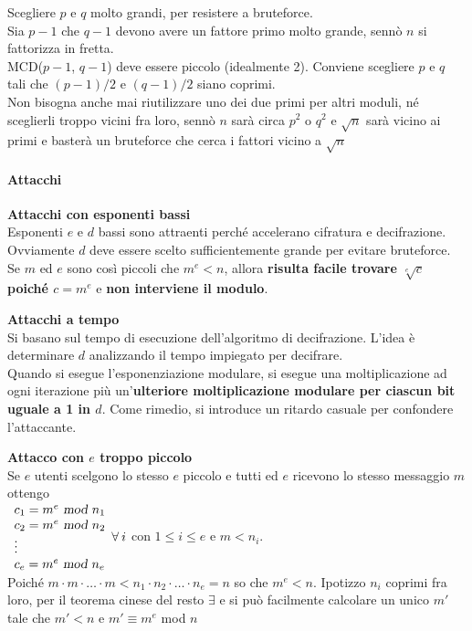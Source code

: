 \documentclass[10pt]{book}
\begin{document}
Scegliere $p$ e $q$ molto grandi, per resistere a bruteforce.\\
Sia $p-1$ che $q-1$ devono avere un fattore primo molto grande, sennò $n$ si fattorizza in fretta.\\
MCD($p-1$, $q-1$) deve essere piccolo (idealmente 2). Conviene scegliere $p$ e $q$ tali che $(p-1)/2$ e $(q-1)/2$ siano coprimi.\\
Non bisogna anche mai riutilizzare uno dei due primi per altri moduli, né sceglierli troppo vicini fra loro, sennò $n$ sarà circa $p^2$ o $q^2$ e $\sqrt{n}$ sarà vicino ai primi e basterà un bruteforce che cerca i fattori vicino a $\sqrt{n}$
\paragraph{Attacchi}
\begin{list}{}{}
	\item \textbf{Attacchi con esponenti bassi}\\
	Esponenti $e$ e $d$ bassi sono attraenti perché accelerano cifratura e decifrazione. Ovviamente $d$ deve essere scelto sufficientemente grande per evitare bruteforce.\\
	Se $m$ ed $e$ sono così piccoli che $m^e < n$, allora \textbf{risulta facile trovare $\sqrt[e]{c}$ poiché $c = m^e$} e \textbf{non interviene il modulo}.
	\item \textbf{Attacchi a tempo}\\
	Si basano sul tempo di esecuzione dell'algoritmo di decifrazione. L'idea è determinare $d$ analizzando il tempo impiegato per decifrare.\\
	Quando si esegue l'esponenziazione modulare, si esegue una moltiplicazione ad ogni iterazione più un'\textbf{ulteriore moltiplicazione modulare per ciascun bit uguale a 1 in $d$}. Come rimedio, si introduce un ritardo casuale per confondere l'attaccante.
	\item \textbf{Attacco con $e$ troppo piccolo}\\
	Se $e$ utenti scelgono lo stesso $e$ piccolo e tutti ed $e$ ricevono lo stesso messaggio $m$ ottengo\\$\begin{array}{l}
	c_1 = m^e\textsl{ mod }n_1\\
	c_2 = m^e\textsl{ mod }n_2\\
	\vdots\\
	c_e = m^e\textsl{ mod }n_e
	\end{array} \forall\:i$ con $1\leq i\leq e$ e $m < n_i$.\\Poiché $m\cdot m\cdot\ldots\cdot m < n_1\cdot n_2\cdot\ldots\cdot n_e = n$ so che $m^e < n$. Ipotizzo $n_i$ coprimi fra loro, per il teorema cinese del resto $\exists$ e si può facilmente calcolare un unico $m'$ tale che $m' < n$ e $m'\equiv m^e$ mod $n$\\

\end{list}
\end{document}
